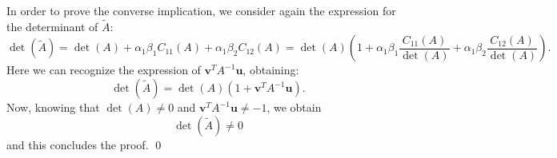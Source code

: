 \documentclass[a4paper,11pt]{article}
\begin{document}
\noindent In order to prove the converse implication, we consider again the expression for the determinant of $\tilde{A}$:
\begin{equation}\label{key}
	\det(\tilde{A}) = \det(A) + \alpha_1 \beta_1 C_{11}(A) + \alpha_1 \beta_2 C_{12}(A) = \det(A) \left( 1+ \alpha_1 \beta_1 \frac{C_{11}(A)}{\det(A)} + \alpha_1 \beta_2 \frac{C_{12}(A)}{\det(A)}\right).
\end{equation}
Here we can recognize the expression of $\textbf{v}^T A^{-1} \textbf{u}$, obtaining:
\begin{equation}\label{key}
	\det(\tilde{A}) = \det(A) (1 + \textbf{v}^T A^{-1} \textbf{u}).
\end{equation}
Now, knowing that $\det(A)\neq 0 $ and $\textbf{v}^T A^{-1} \textbf{u} \neq -1$, we obtain
\begin{equation}\label{key}
	\det(\tilde{A}) \neq 0
\end{equation}
and this concludes the proof. \qed \\
\end{document}
